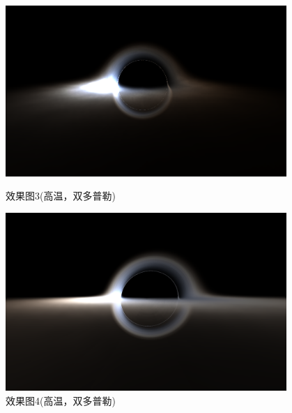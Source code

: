 \documentclass[a4paper, 12pt]{article}
\begin{document}
\begin{figure}[H]
\begin{minipage}[t]{0.48\textwidth}
            \includegraphics[width=0.95\textwidth]{photo/gb2.png}
            \caption{效果图3(高温，双多普勒)}
        \end{minipage}
        \hfill
        \begin{minipage}[t]{0.48\textwidth}
            \centering
            \includegraphics[width=0.95\textwidth]{photo/gb3.png}
            \caption{效果图4(高温，双多普勒)}
        \end{minipage}
    \end{figure}
\end{document}
